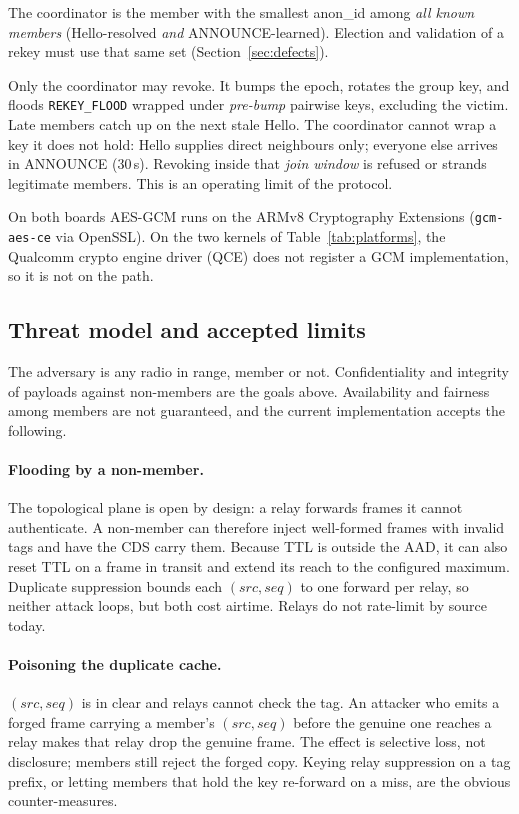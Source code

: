 \documentclass[conference,10pt]{IEEEtran}
\begin{document}
The coordinator is the member with the smallest anon\_id among
\emph{all known members} (Hello-resolved \emph{and} ANNOUNCE-learned).
Election and validation of a rekey must use that same set
(Section~\ref{sec:defects}).

Only the coordinator may revoke. It bumps the epoch, rotates the group
key, and floods \texttt{REKEY\_FLOOD} wrapped under \emph{pre-bump}
pairwise keys, excluding the victim. Late members catch up on the next
stale Hello. The coordinator cannot wrap a key it does not hold: Hello
supplies direct neighbours only; everyone else arrives in ANNOUNCE
(30\,s). Revoking inside that \emph{join window} is refused or strands
legitimate members. This is an operating limit of the protocol.

On both boards AES-GCM runs on the ARMv8 Cryptography Extensions
(\texttt{gcm-aes-ce} via OpenSSL). On the two kernels of
Table~\ref{tab:platforms}, the Qualcomm crypto engine driver (QCE) does
not register a GCM implementation, so it is not on the path.

\subsection{Threat model and accepted limits}
\label{sec:threat}

The adversary is any radio in range, member or not. Confidentiality and
integrity of payloads against non-members are the goals above.
Availability and fairness among members are not guaranteed, and the
current implementation accepts the following.

\paragraph{Flooding by a non-member.} The topological plane is open by
design: a relay forwards frames it cannot authenticate. A non-member can
therefore inject well-formed frames with invalid tags and have the CDS
carry them. Because TTL is outside the AAD, it can also reset TTL on a
frame in transit and extend its reach to the configured maximum.
Duplicate suppression bounds each $(\mathit{src},\mathit{seq})$ to one
forward per relay, so neither attack loops, but both cost airtime. Relays
do not rate-limit by source today.

\paragraph{Poisoning the duplicate cache.} $(\mathit{src},\mathit{seq})$
is in clear and relays cannot check the tag. An attacker who emits a
forged frame carrying a member's $(\mathit{src},\mathit{seq})$ before the
genuine one reaches a relay makes that relay drop the genuine frame. The
effect is selective loss, not disclosure; members still reject the forged
copy. Keying relay suppression on a tag prefix, or letting members that
hold the key re-forward on a miss, are the obvious counter-measures.
\end{document}
